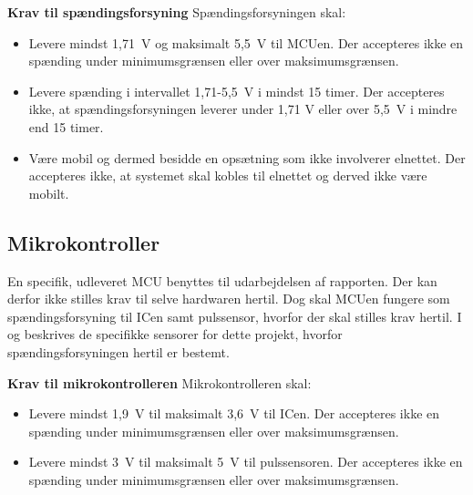 \textbf{Krav til spændingsforsyning} \newline 
Spændingsforsyningen skal:
\begin{itemize}
	\item Levere mindst 1,71~V og maksimalt 5,5~V til MCUen. Der accepteres ikke en spænding under minimumsgrænsen eller over maksimumsgrænsen.
	\item Levere spænding i intervallet 1,71-5,5~V i mindst 15 timer. Der accepteres ikke, at spændingsforsyningen leverer under 1,71 V eller over 5,5~V i mindre end 15 timer.
	\item Være mobil og dermed besidde en opsætning som ikke involverer elnettet. Der accepteres ikke, at systemet skal kobles til elnettet og derved ikke være mobilt.
\end{itemize}

\subsection{Mikrokontroller} \label{krav_mikro_spaending}
En specifik, udleveret MCU benyttes til udarbejdelsen af rapporten. Der kan derfor ikke stilles krav til selve hardwaren hertil. Dog skal MCUen fungere som spændingsforsyning til ICen samt pulssensor, hvorfor der skal stilles krav hertil. I  og  beskrives de specifikke sensorer for dette projekt, hvorfor spændingsforsyningen hertil er bestemt.

\textbf{Krav til mikrokontrolleren} \newline 
Mikrokontrolleren skal:
\begin{itemize}
	\item Levere mindst 1,9~V til maksimalt 3,6~V til ICen. Der accepteres ikke en spænding under minimumsgrænsen eller over maksimumsgrænsen.
	\item Levere mindst 3~V til maksimalt 5~V til pulssensoren. Der accepteres ikke en spænding under minimumsgrænsen eller over maksimumsgrænsen.
\end{itemize}


